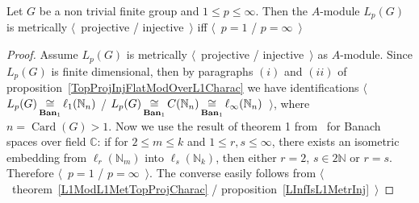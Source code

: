 \begin{proposition}\label{LpFinGrL1MGMetrInjProjCharac} Let $G$ be a non trivial
finite group and $1\leq p\leq \infty$. Then the $A$-module $L_p(G)$ is
metrically $\langle$~projective / injective~$\rangle$ iff $\langle$~$p=1$ /
$p=\infty$~$\rangle$
\end{proposition}
\begin{proof} 
Assume $L_p(G)$ is metrically $\langle$~projective / injective~$\rangle$ as
$A$-module. Since $L_p(G)$ is finite dimensional, then by paragraphs $(i)$ and
$(ii)$ of proposition~\ref{TopProjInjFlatModOverL1Charac} we have 
identifications $\langle$~$L_p(G)\mathop{\mathbin{\cong}}\limits_{\mathbf{Ban}_1}\ell_1(\mathbb{N}_n)$ /
$L_p(G)
\mathop{\mathbin{\cong}}\limits_{\mathbf{Ban}_1}
C(\mathbb{N}_n)
\mathop{\mathbin{\cong}}\limits_{\mathbf{Ban}_1}
\ell_\infty(\mathbb{N}_n)$~$\rangle$, 
where $n=\operatorname{Card}(G)>1$. Now we use the result of theorem
1 from~\cite{LyubIsomEmdbFinDimLp} for Banach spaces over field $\mathbb{C}$: if
for $2\leq m\leq k$ and $1\leq r,s\leq \infty$, there exists an isometric
embedding from $\ell_r(\mathbb{N}_m)$ into $\ell_s(\mathbb{N}_k)$, then either
$r=2$, $s\in 2\mathbb{N}$ or $r=s$. Therefore $\langle$~$p=1$ /
$p=\infty$~$\rangle$. The converse easily follows from
$\langle$~theorem~\ref{L1ModL1MetTopProjCharac} /
proposition~\ref{LInfIsL1MetrInj}~$\rangle$
\end{proof}

